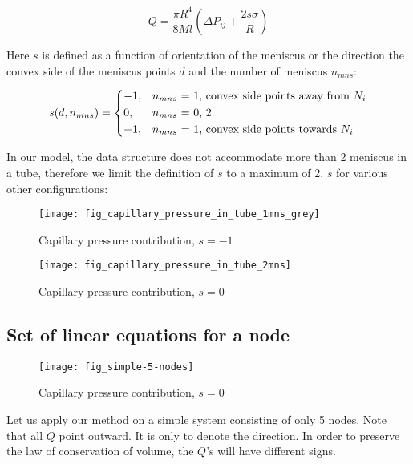 	\begin{equation}
		Q = \frac{\pi R^4}{8Ml} \left( \Delta P_{ij} + \frac{2s \sigma}{R} \right)
	\end{equation}
	
	Here $s$ is defined as a function of orientation of the meniscus or the direction the convex side of the meniscus points $d$ and the number of meniscus $n_{mns}$:
	
	\begin{equation} \label{eq:sign-func-def}
		s(d, n_{mns}) = 
		\begin{dcases}
			-1,&\text{$n_{mns}$ = 1, convex side points away from $N_{i}$}\\
			0,&\text{$n_{mns}$ = 0, 2}\\
			+1,&\text{$n_{mns}$ = 1, convex side points towards $N_{i}$}
		\end{dcases}
	\end{equation}
	
	In our model, the data structure does not accommodate more than 2 meniscus in a tube, therefore we limit the definition of $s$ to a maximum of 2. $s$ for various other configurations:
	
	\begin{figure}[H]
		\centering
		\texttt{[image: fig\_capillary\_pressure\_in\_tube\_1mns\_grey]}
		\caption{Capillary pressure contribution, $s = -1$}
		\label{fig:capillary_pressure_in_tube_1mns_grey}
	\end{figure}
	
	\begin{figure}[H]
		\centering
		\texttt{[image: fig\_capillary\_pressure\_in\_tube\_2mns]}
		\caption{Capillary pressure contribution, $s = 0$}
		\label{fig:capillary_pressure_in_tube_2mns}
	\end{figure}
	
\subsection{Set of linear equations for a node} \label{sec:linear-equ}
	\begin{figure}[H]
		\centering
		\texttt{[image: fig\_simple-5-nodes]}
		\caption{Capillary pressure contribution, $s = 0$}
		\label{fig:simple-5-nodes}
	\end{figure}
	
	Let us apply our method on a simple system consisting of only 5 nodes.
	Note that all $Q$ point outward. It is only to denote the direction. In order to preserve the law of conservation of volume, the $Q$'s will have different signs.

